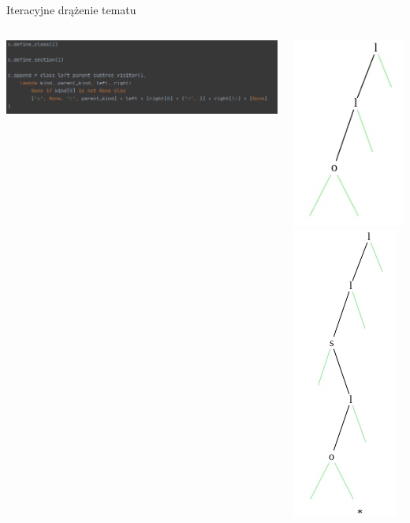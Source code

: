 \documentclass[final]{beamer}
\theoremstyle{bluetheorem}
\theoremstyle{bluetheorem}
\theoremstyle{greentheorem}
\begin{document}
\begin{frame}{Iteracyjne drążenie tematu}
    \begin{columns}
        \begin{block}{}
            \begin{center}
                \includegraphics[width=\textwidth]{framework_007.png}
            \end{center}
        \end{block}

        \begin{block}{}
            \begin{center}
                \includegraphics[height=.6\textwidth]{example_006.png}
                \raisebox{.3\textwidth}{$\rightarrow$}
                \includegraphics[height=.6\textwidth]{example_005.png}


\end{center}
\end{block}
\end{columns}
\end{frame}
\end{document}
